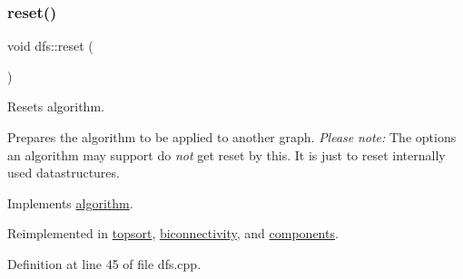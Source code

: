 \subsubsection{\texorpdfstring{reset()}{reset()}}
{\footnotesize\ttfamily void dfs\+::reset (\begin{DoxyParamCaption}{ }\end{DoxyParamCaption})\hspace{0.3cm}{\ttfamily [virtual]}}



Resets algorithm. 

Prepares the algorithm to be applied to another graph. {\itshape Please} {\itshape note\+:} The options an algorithm may support do {\itshape not} get reset by this. It is just to reset internally used datastructures. 

Implements \mbox{\hyperlink{classalgorithm_a21aba63d066ae7897de6ca7d8425c408}{algorithm}}.



Reimplemented in \mbox{\hyperlink{classtopsort_aa3d9ccc7c632dac6b7303e9828c14f62}{topsort}}, \mbox{\hyperlink{classbiconnectivity_a4393dd1e626887472f6967722349abc6}{biconnectivity}}, and \mbox{\hyperlink{classcomponents_a07b6bab5962524ae26ccb478b35cd76c}{components}}.



Definition at line 45 of file dfs.\+cpp.


